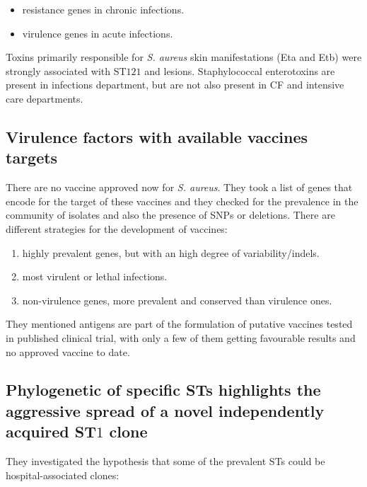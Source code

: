     \begin{multicols}{2}
        \begin{itemize}
            \item resistance genes in chronic infections.
            \item virulence genes in acute infections.
        \end{itemize}
    \end{multicols}

    Toxins primarily responsible for \emph{S. aureus} skin manifestations (Eta and Etb) were strongly associated with ST$121$ and lesions.
    Staphylococcal enterotoxins are present in infections department, but are not also present in CF and intensive care departments.

    \subsection{Virulence factors with available vaccines targets}
    There are no vaccine approved now for \emph{S. aureus}.
    They took a list of genes that encode for the target of these vaccines and they checked for the prevalence in the community of isolates and also the presence of SNPs or deletions.
    There are different strategies for the development of vaccines:

    \begin{multicols}{2}
        \begin{enumerate}
            \item highly prevalent genes, but with an high degree of variability/indels.
            \item most virulent or lethal infections.
            \item non-virulence genes, more prevalent and conserved than virulence ones.
        \end{enumerate}
    \end{multicols}

    They mentioned antigens are part of the formulation of putative vaccines tested in published clinical trial, with only a few of them getting favourable results and no approved vaccine to date.

\subsection{Phylogenetic of specific STs highlights the aggressive spread of a novel independently acquired ST$1$ clone}
They investigated the hypothesis that some of the prevalent STs could be hospital-associated clones:

